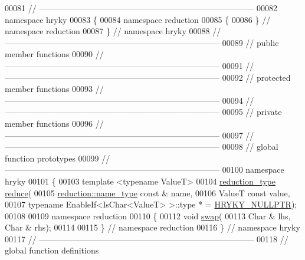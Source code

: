 \begin{DoxyCode}
00081 \textcolor{comment}{//
      ------------------------------------------------------------------------------}
00082 \textcolor{keyword}{namespace }hryky
00083 \{
00084 \textcolor{keyword}{namespace }reduction
00085 \{
00086 \} \textcolor{comment}{// namespace reduction}
00087 \} \textcolor{comment}{// namespace hryky}
00088 \textcolor{comment}{//
      ------------------------------------------------------------------------------}
00089 \textcolor{comment}{// public member functions}
00090 \textcolor{comment}{//
      ------------------------------------------------------------------------------}
00091 \textcolor{comment}{//
      ------------------------------------------------------------------------------}
00092 \textcolor{comment}{// protected member functions}
00093 \textcolor{comment}{//
      ------------------------------------------------------------------------------}
00094 \textcolor{comment}{//
      ------------------------------------------------------------------------------}
00095 \textcolor{comment}{// private member functions}
00096 \textcolor{comment}{//
      ------------------------------------------------------------------------------}
00097 \textcolor{comment}{//
      ------------------------------------------------------------------------------}
00098 \textcolor{comment}{// global function prototypes}
00099 \textcolor{comment}{//
      ------------------------------------------------------------------------------}
00100 \textcolor{keyword}{namespace }hryky
00101 \{
00103     \textcolor{keyword}{template} <\textcolor{keyword}{typename} ValueT>
00104     \hyperlink{namespacehryky_a343a9a4c36a586be5c2693156200eadc}{reduction_type} \hyperlink{namespacehryky_af41cb3af6766761da0ff21b84527a52c}{reduce}(
00105         \hyperlink{namespacehryky_1_1reduction_ac686c30a4c8d196bbd0f05629a6b921f}{reduction::name_type} \textcolor{keyword}{const} & name,
00106         ValueT \textcolor{keyword}{const} value,
00107         \textcolor{keyword}{typename} EnableIf<IsChar<ValueT> >::type * = \hyperlink{common_8h_a4cd4ac09cfcdbd6b30ee69afc156e210}{HRYKY_NULLPTR});
00108 
00109 \textcolor{keyword}{namespace }reduction
00110 \{
00112     \textcolor{keywordtype}{void} \hyperlink{namespacehryky_1_1reduction_a493c83efdf5f9e9c49ba77e1b65325a1}{swap}(
00113         Char & lhs, Char & rhs);
00114 
00115 \} \textcolor{comment}{// namespace reduction}
00116 \} \textcolor{comment}{// namespace hryky}
00117 \textcolor{comment}{//
      ------------------------------------------------------------------------------}
00118 \textcolor{comment}{// global function definitions}

\end{DoxyCode}

